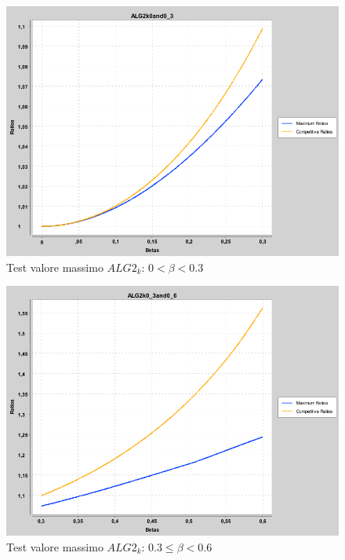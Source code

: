\documentclass[12pt]{article}
\renewcommand{\thefigure}{\thesubsection.\arabic{figure}}
\begin{document}
\setcounter{figure}{0} 
\renewcommand{\thefigure}{\thesubsection.\arabic{figure}}
\begin{figure}[H]
\caption{Test valore massimo $ALG2_{k}$: $0 < \beta < 0.3$}
\centering
\includegraphics[scale=0.4]{max/ALG2k0and0_3.png}
\end{figure}
\begin{figure}[H]
\caption{Test valore massimo $ALG2_{k}$: $0.3 \leq  \beta < 0.6$}
\centering
\includegraphics[scale=0.4]{max/ALG2k0_3and0_6.png}
\end{figure}
\end{document}
